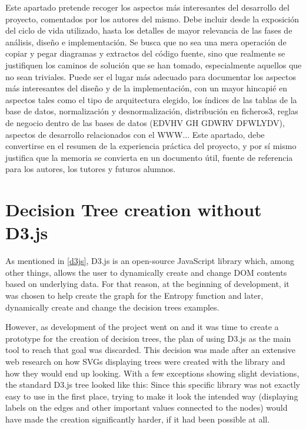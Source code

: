 
Este apartado pretende recoger los aspectos más interesantes del desarrollo del proyecto, comentados por los autores del mismo.
Debe incluir desde la exposición del ciclo de vida utilizado, hasta los detalles de mayor relevancia de las fases de análisis, diseño e implementación.
Se busca que no sea una mera operación de copiar y pegar diagramas y extractos del código fuente, sino que realmente se justifiquen los caminos de solución que se han tomado, especialmente aquellos que no sean triviales.
Puede ser el lugar más adecuado para documentar los aspectos más interesantes del diseño y de la implementación, con un mayor hincapié en aspectos tales como el tipo de arquitectura elegido, los índices de las tablas de la base de datos, normalización y desnormalización, distribución en ficheros3, reglas de negocio dentro de las bases de datos (EDVHV GH GDWRV DFWLYDV), aspectos de desarrollo relacionados con el WWW...
Este apartado, debe convertirse en el resumen de la experiencia práctica del proyecto, y por sí mismo justifica que la memoria se convierta en un documento útil, fuente de referencia para los autores, los tutores y futuros alumnos.

\section{Decision Tree creation without D3.js}
As mentioned in \ref{d3js}, D3.js is an open-source JavaScript library which, among other things, allows the user to dynamically create and change DOM contents based on underlying data. For that reason, at the beginning of development, it was chosen to help create the graph for the Entropy function and later, dynamically create and change the decision trees examples.

However, as development of the project went on and it was time to create a prototype for the creation of decision trees, the plan of using D3.js as the main tool to reach that goal was discarded. This decision was made after an extensive web research on how SVGs displaying trees were created with the library and how they would end up looking. With a few exceptions showing slight deviations, the standard D3.js tree looked like this:
Since this specific library was not exactly easy to use in the first place, trying to make it look the intended way (displaying labels on the edges and other important values connected to the nodes) would have made the creation significantly harder, if it had been possible at all.

